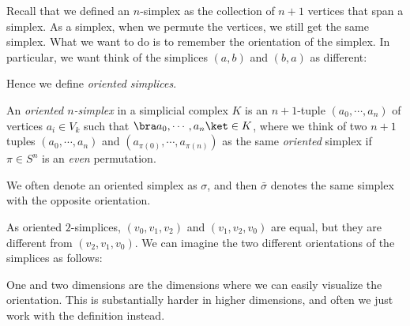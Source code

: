 \documentclass[a4paper]{article}
\begin{document}
Recall that we defined an $n$-simplex as the collection of $n + 1$ vertices that span a simplex. As a simplex, when we permute the vertices, we still get the same simplex. What we want to do is to remember the orientation of the simplex. In particular, we want think of the simplices $(a, b)$ and $(b, a)$ as different:
\begin{center}
\end{center}
Hence we define \emph{oriented simplices}.

\begin{defi}
  An \emph{oriented $n$-simplex} in a simplicial complex $K$ is an $n + 1$-tuple $(a_0, \cdots, a_n)$ of vertices $a_i \in V_k$ such that $\bra a_0, \cdots, a_n\ket \in K$, where we think of two $n + 1$ tuples $(a_0, \cdots, a_n)$ and $(a_{\pi(0)}, \cdots, a_{\pi(n)})$ as the same \emph{oriented} simplex if $\pi \in S^n$ is an \emph{even} permutation.

  We often denote an oriented simplex as $\sigma$, and then $\bar{\sigma}$ denotes the same simplex with the opposite orientation.
\end{defi}

\begin{eg}
  As oriented $2$-simplices, $(v_0, v_1, v_2)$ and $(v_1, v_2, v_0)$ are equal, but they are different from $(v_2, v_1, v_0)$. We can imagine the two different orientations of the simplices as follows:
  \begin{center}
  \end{center}
\end{eg}
One and two dimensions are the dimensions where we can easily visualize the orientation. This is substantially harder in higher dimensions, and often we just work with the definition instead.
\end{document}
